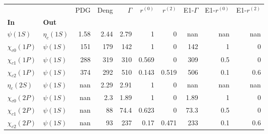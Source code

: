 \begin{tabular}{l|l|r|r|r|r|r|r|r|r}
\toprule
                &            &  PDG &  Deng &  $\Gamma$ &  $r^{(0)}$ &  $r^{(2)}$ &  E1-$\Gamma$ &  E1-$r^{(0)}$ &  E1-$r^{(2)}$ \\
\textbf{In} & \textbf{Out} &      &       &           &            &            &              &               &               \\
\midrule
\textbf{$\psi(1S)$} & \textbf{$\eta_{c}(1S)$} & 1.58 &  2.44 &      2.79 &          1 &          0 &          nan &           nan &           nan \\
\textbf{$\chi_{c0}(1P)$} & \textbf{$\psi(1S)$} &  151 &   179 &       142 &          1 &          0 &          142 &             1 &             0 \\
\textbf{$\chi_{c1}(1P)$} & \textbf{$\psi(1S)$} &  288 &   319 &       310 &      0.569 &          0 &          309 &           0.5 &             0 \\
\textbf{$\chi_{c2}(1P)$} & \textbf{$\psi(1S)$} &  374 &   292 &       510 &      0.143 &      0.519 &          506 &           0.1 &           0.6 \\
\textbf{$\eta_{c}(2S)$} & \textbf{$\psi(1S)$} &  nan &  2.29 &      2.91 &          1 &          0 &          nan &           nan &           nan \\
\textbf{$\chi_{c0}(2P)$} & \textbf{$\psi(1S)$} &  nan &   2.3 &      1.89 &          1 &          0 &         1.89 &             1 &             0 \\
\textbf{$\chi_{c1}(2P)$} & \textbf{$\psi(1S)$} &  nan &    88 &      74.4 &      0.623 &          0 &         73.3 &           0.5 &             0 \\
\textbf{$\chi_{c2}(2P)$} & \textbf{$\psi(1S)$} &  nan &    93 &       237 &       0.17 &      0.471 &          233 &           0.1 &           0.6 \\
\bottomrule
\end{tabular}
